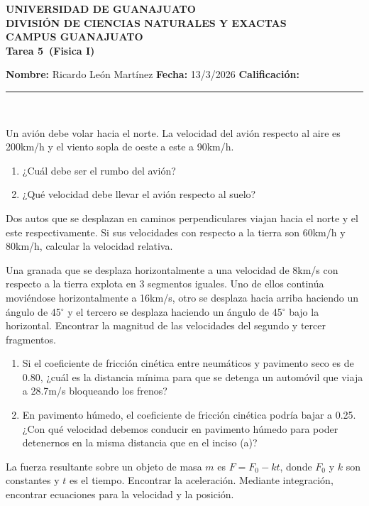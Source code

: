 \documentclass[12pt,a4paper]{article}
\newcommand{\alumno}{Ricardo León Martínez}
\newcommand{\materia}{Fisica I}
\newcommand{\tarea}{Tarea 5}
\newcommand{\fecha}{13/3/2026}
\begin{document}
    \begin{center}
    {\large\textbf{UNIVERSIDAD DE GUANAJUATO}}\\[0.3cm]
    {\normalsize\textbf{DIVISIÓN DE CIENCIAS NATURALES Y EXACTAS}}\\
    {\normalsize\textbf{CAMPUS GUANAJUATO}}\\[1cm]

    {\Large\textbf{\tarea\ (\materia)}}\\[1cm]
    \end{center}

    \textbf{Nombre:} \alumno \hfill 
    \textbf{Fecha:} \fecha \hfill 
    \textbf{Calificación:} \rule{3cm}{0.4pt} \\[0.3cm]

    \begin{problema}
        Un avión debe volar hacia el norte. La velocidad del avión respecto al aire es
        200km/h y el viento sopla de oeste a este a 90km/h.
        \begin{enumerate}
            \item[(a)] ¿Cuál debe ser el rumbo del avión?
            \item[(b)] ¿Qué velocidad debe llevar el avión respecto al suelo? 
        \end{enumerate}
    \end{problema}

    \begin{problema}
        Dos autos que se desplazan en caminos perpendiculares viajan hacia el norte y el este
        respectivamente. Si sus velocidades con respecto a la tierra son 60km/h y 80km/h, calcular
        la velocidad relativa.
    \end{problema}

    \begin{problema}
        Una granada que se desplaza horizontalmente a una velocidad de 8km/s con respecto a la tierra
        explota en 3 segmentos iguales. Uno de ellos continúa moviéndose horizontalmente a 16km/s,
        otro se desplaza hacia arriba haciendo un ángulo de 45$^{\circ}$ y el tercero se desplaza
        haciendo un ángulo de 45$^{\circ}$ bajo la horizontal. Encontrar la magnitud de las velocidades
        del segundo y tercer fragmentos.
    \end{problema}

    \begin{problema}
        \begin{enumerate}
            \item[(a)] Si el coeficiente de fricción cinética entre neumáticos y pavimento seco es de
            0.80, ¿cuál es la distancia mínima para que se detenga un automóvil que viaja a 28.7m/s bloqueando
            los frenos?
            \item[(b)] En pavimento húmedo, el coeficiente de fricción cinética podría bajar a 0.25.
            ¿Con qué velocidad debemos conducir en pavimento húmedo para poder detenernos en la misma
            distancia que en el inciso (a)?
        \end{enumerate}
    \end{problema}

    \begin{problema}
        La fuerza resultante sobre un objeto de masa $m$ es $F=F_{0}-kt$, donde $F_{0}$ y $k$
        son constantes y $t$ es el tiempo. Encontrar la aceleración. Mediante integración, encontrar
        ecuaciones para la velocidad y la posición.
    \end{problema}
\end{document}
